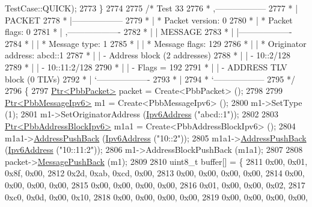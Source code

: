 \begin{DoxyCode}
      TestCase::QUICK);
2773   \}
2774 
2775   \textcolor{comment}{/* Test 33}
2776 \textcolor{comment}{         * ,------------------}
2777 \textcolor{comment}{         * |  PACKET}
2778 \textcolor{comment}{         * |------------------}
2779 \textcolor{comment}{         * | * Packet version:    0}
2780 \textcolor{comment}{         * | * Packet flags:  0}
2781 \textcolor{comment}{         * |    ,-------------------}
2782 \textcolor{comment}{         * |    |  MESSAGE}
2783 \textcolor{comment}{         * |    |-------------------}
2784 \textcolor{comment}{         * |    | * Message type:       1}
2785 \textcolor{comment}{         * |    | * Message flags:  129}
2786 \textcolor{comment}{         * |    | * Originator address: abcd::1}
2787 \textcolor{comment}{         * |    | - Address block (2 addresses)}
2788 \textcolor{comment}{         * |    |     - 10::2/128}
2789 \textcolor{comment}{         * |    |     - 10::11:2/128}
2790 \textcolor{comment}{         * |    |     - Flags = 192}
2791 \textcolor{comment}{         * |    | - ADDRESS TLV block (0 TLVs)}
2792 \textcolor{comment}{         * |    `-------------------}
2793 \textcolor{comment}{         * |}
2794 \textcolor{comment}{         * `------------------}
2795 \textcolor{comment}{   */}
2796   \{
2797     \hyperlink{classns3_1_1Ptr}{Ptr<PbbPacket>} packet = Create<PbbPacket> ();
2798 
2799     \hyperlink{classns3_1_1Ptr}{Ptr<PbbMessageIpv6>} m1 = Create<PbbMessageIpv6> ();
2800     m1->SetType (1);
2801     m1->SetOriginatorAddress (\hyperlink{classns3_1_1Ipv6Address}{Ipv6Address} (\textcolor{stringliteral}{"abcd::1"}));
2802 
2803     \hyperlink{classns3_1_1Ptr}{Ptr<PbbAddressBlockIpv6>} m1a1 = Create<PbbAddressBlockIpv6> ();
2804     m1a1->\hyperlink{classns3_1_1PbbAddressBlock_a7be545a53d69bd426dbebcf752ed8371}{AddressPushBack} (\hyperlink{classns3_1_1Ipv6Address}{Ipv6Address} (\textcolor{stringliteral}{"10::2"}));
2805     m1a1->\hyperlink{classns3_1_1PbbAddressBlock_a7be545a53d69bd426dbebcf752ed8371}{AddressPushBack} (\hyperlink{classns3_1_1Ipv6Address}{Ipv6Address} (\textcolor{stringliteral}{"10::11:2"}));
2806     m1->AddressBlockPushBack (m1a1);
2807 
2808     packet->\hyperlink{classns3_1_1PbbPacket_a4a3170001ef758d9c9c4375b8f089826}{MessagePushBack} (m1);
2809 
2810     uint8\_t buffer[] = \{
2811       0x00, 0x01, 0x8f, 0x00,
2812       0x2d, 0xab, 0xcd, 0x00,
2813       0x00, 0x00, 0x00, 0x00,
2814       0x00, 0x00, 0x00, 0x00,
2815       0x00, 0x00, 0x00, 0x00,
2816       0x01, 0x00, 0x00, 0x02,
2817       0xc0, 0x0d, 0x00, 0x10,
2818       0x00, 0x00, 0x00, 0x00,
2819       0x00, 0x00, 0x00, 0x00,

\end{DoxyCode}
